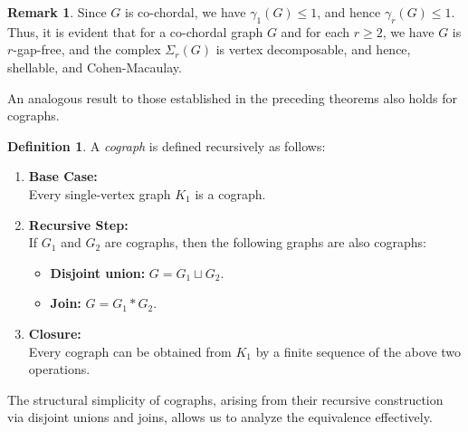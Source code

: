 \documentclass[12pt,reqno]{amsart}
\theoremstyle{definition}
\newtheorem{remark}[proposition]{Remark}
\newtheorem{definition}[proposition]{Definition}
\begin{document}
	\begin{remark}
		Since $G$ is co-chordal, we have $\gamma_1(G)\le 1$, and hence $\gamma_r(G)\le 1$. Thus, it is evident that for a co-chordal graph $G$ and for each $r\ge 2$, we have $G$ is $r$-gap-free, and the complex $\Sigma_{r}(G)$ is vertex decomposable, and hence, shellable, and Cohen-Macaulay. 
	\end{remark}

 An analogous result to those established in the preceding theorems also holds for cographs. 

\begin{definition}
A \emph{cograph} is defined recursively as follows:

\begin{enumerate}
    \item \textbf{Base Case:}\\
    Every single-vertex graph $K_1$ is a cograph.

    \item \textbf{Recursive Step:} \\
    If $G_1$ and $G_2$ are cographs, then the following graphs are also cographs:
    \begin{itemize}
        \item \textbf{Disjoint union:} $G = G_1 \sqcup G_2$.
        \item \textbf{Join:} $G = G_1 * G_2$.
    \end{itemize}

    \item \textbf{Closure:} \\
    Every cograph can be obtained from $K_1$ by a finite sequence of the above two operations.
\end{enumerate}
\end{definition}

The structural simplicity of cographs, arising from their recursive construction via disjoint unions and joins, allows us to analyze the equivalence effectively.
\end{document}

